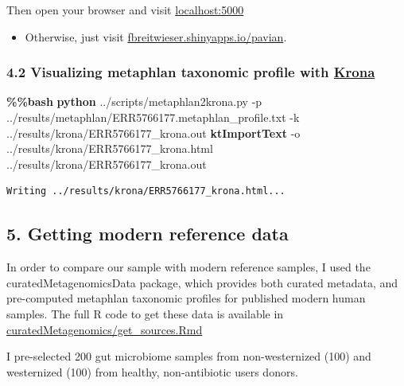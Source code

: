 \documentclass[
  letterpaper,
]{book}
\newenvironment{Shaded}{}{}
\newcommand{\AttributeTok}[1]{\textcolor[rgb]{0.84,0.23,0.29}{#1}}
\newcommand{\ExtensionTok}[1]{\textcolor[rgb]{0.84,0.23,0.29}{\textbf{#1}}}
\newcommand{\NormalTok}[1]{\textcolor[rgb]{0.14,0.16,0.18}{#1}}
\providecommand{\tightlist}{%
  \setlength{\itemsep}{0pt}\setlength{\parskip}{0pt}}\usepackage{longtable,booktabs,array}
\begin{document}
Then open your browser and visit \url{localhost:5000}

\begin{itemize}
\tightlist
\item
  Otherwise, just visit
  \href{https://fbreitwieser.shinyapps.io/pavian/.}{fbreitwieser.shinyapps.io/pavian}.
\end{itemize}

\hypertarget{visualizing-metaphlan-taxonomic-profile-with-krona}{%
\subsubsection{\texorpdfstring{4.2 Visualizing metaphlan taxonomic
profile with
\href{https://github.com/marbl/Krona/wiki}{Krona}}{4.2 Visualizing metaphlan taxonomic profile with Krona}}\label{visualizing-metaphlan-taxonomic-profile-with-krona}}

\begin{Shaded}
\begin{Highlighting}[]
\ExtensionTok{\%\%bash}
\ExtensionTok{python}\NormalTok{ ../scripts/metaphlan2krona.py }\AttributeTok{{-}p}\NormalTok{ ../results/metaphlan/ERR5766177.metaphlan\_profile.txt }\AttributeTok{{-}k}\NormalTok{ ../results/krona/ERR5766177\_krona.out}
\ExtensionTok{ktImportText} \AttributeTok{{-}o}\NormalTok{ ../results/krona/ERR5766177\_krona.html ../results/krona/ERR5766177\_krona.out}
\end{Highlighting}
\end{Shaded}

\begin{verbatim}
Writing ../results/krona/ERR5766177_krona.html...
\end{verbatim}

\hypertarget{getting-modern-reference-data}{%
\subsection{5. Getting modern reference
data}\label{getting-modern-reference-data}}

In order to compare our sample with modern reference samples, I used the
curatedMetagenomicsData package, which provides both curated metadata,
and pre-computed metaphlan taxonomic profiles for published modern human
samples. The full R code to get these data is available in
\href{./curatedMetagenomics/get_sources.Rmd}{curatedMetagenomics/get\_sources.Rmd}

I pre-selected 200 gut microbiome samples from non-westernized (100) and
westernized (100) from healthy, non-antibiotic users donors.
\end{document}
